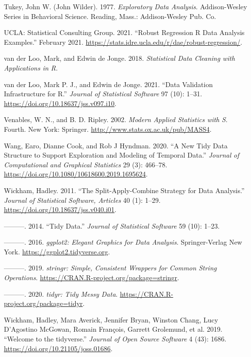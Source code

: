 \documentclass{article}
\begin{document}
\leavevmode\hypertarget{ref-tukey}{}%
Tukey, John W. (John Wilder). 1977. \emph{Exploratory Data Analysis}. Addison-Wesley Series in Behavioral Science. Reading, Mass.: Addison-Wesley Pub. Co.

\leavevmode\hypertarget{ref-rlm}{}%
UCLA: Statistical Consulting Group. 2021. ``Robust Regression \textbar{} R Data Analysis Examples.'' February 2021. \url{https://stats.idre.ucla.edu/r/dae/robust-regression/}.

\leavevmode\hypertarget{ref-LooMarkvander2018Sdcw}{}%
van der Loo, Mark, and Edwin de Jonge. 2018. \emph{Statistical Data Cleaning with Applications in R}.

\leavevmode\hypertarget{ref-validate}{}%
van der Loo, Mark P. J., and Edwin de Jonge. 2021. ``Data Validation Infrastructure for R.'' \emph{Journal of Statistical Software} 97 (10): 1--31. \url{https://doi.org/10.18637/jss.v097.i10}.

\leavevmode\hypertarget{ref-mass}{}%
Venables, W. N., and B. D. Ripley. 2002. \emph{Modern Applied Statistics with S}. Fourth. New York: Springer. \url{http://www.stats.ox.ac.uk/pub/MASS4}.

\leavevmode\hypertarget{ref-tsibble}{}%
Wang, Earo, Dianne Cook, and Rob J Hyndman. 2020. ``A New Tidy Data Structure to Support Exploration and Modeling of Temporal Data.'' \emph{Journal of Computational and Graphical Statistics} 29 (3): 466--78. \url{https://doi.org/10.1080/10618600.2019.1695624}.

\leavevmode\hypertarget{ref-plyr}{}%
Wickham, Hadley. 2011. ``The Split-Apply-Combine Strategy for Data Analysis.'' \emph{Journal of Statistical Software, Articles} 40 (1): 1--29. \url{https://doi.org/10.18637/jss.v040.i01}.

\leavevmode\hypertarget{ref-WickhamHadley2014TD}{}%
---------. 2014. ``Tidy Data.'' \emph{Journal of Statistical Software} 59 (10): 1--23.

\leavevmode\hypertarget{ref-ggplot2}{}%
---------. 2016. \emph{ggplot2: Elegant Graphics for Data Analysis}. Springer-Verlag New York. \url{https://ggplot2.tidyverse.org}.

\leavevmode\hypertarget{ref-stringr}{}%
---------. 2019. \emph{stringr: Simple, Consistent Wrappers for Common String Operations}. \url{https://CRAN.R-project.org/package=stringr}.

\leavevmode\hypertarget{ref-tidyr}{}%
---------. 2020. \emph{tidyr: Tidy Messy Data}. \url{https://CRAN.R-project.org/package=tidyr}.

\leavevmode\hypertarget{ref-tidyverse}{}%
Wickham, Hadley, Mara Averick, Jennifer Bryan, Winston Chang, Lucy D'Agostino McGowan, Romain François, Garrett Grolemund, et al. 2019. ``Welcome to the tidyverse.'' \emph{Journal of Open Source Software} 4 (43): 1686. \url{https://doi.org/10.21105/joss.01686}.
\end{document}
